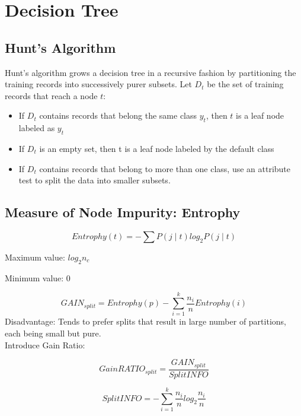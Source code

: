 \chapter{Decision Tree}

\section{Hunt's Algorithm}

Hunt's algorithm grows a decision tree in a recursive fashion by partitioning the training records into successively purer subsets. Let $D_t$ be the set of training records that reach a node $t$:

\begin{itemize}
\item If $D_t$ contains records that belong the same class $y_t$, then $t$ is a leaf node labeled as $y_t$
\item If $D_t$ is an empty set, then t is a leaf node labeled by the default class
\item If $D_t$ contains records that belong to more than one class, use an attribute test to split the data into smaller subsets.
\end{itemize}

\section{Measure of Node Impurity: Entrophy}

$$Entrophy(t)=-\sum P(j \mid t) log_2 P(j \mid t)$$ 

\noindent Maximum value: $log_{2} n_{c}$

\noindent Minimum value: 0

$$GAIN_{split}=Entrophy(p)-\sum_{i=1}^{k} \frac{n_i}{n}Entrophy(i)$$
\noindent
Disadvantage: Tends to prefer splits that result in large number of partitions, each being small but pure. \\

\noindent Introduce Gain Ratio: 

$$GainRATIO_{split}=\frac{GAIN_{split}}{SplitINFO}$$

$$SplitINFO=-\sum_{i=1}^{k} \frac{n_i}{n}log_2 \frac{n_i}{n}$$ \\

